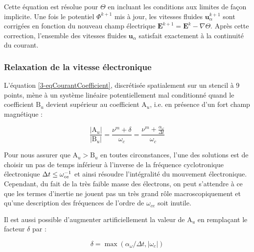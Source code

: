 \begin{refsection}
Cette équation est résolue pour $\Theta$ en incluant les conditions aux limites
de façon implicite. Une fois le potentiel $\Phi^{k+1}$ mis à jour, les vitesses
fluides $\mathbf u^{k+1}_\alpha$ sont corrigées en fonction du nouveau champ
électrique $\mathbf{E}^{k+1}=\mathbf{E}^{k}-\nabla\Theta$.
Après cette correction, l'ensemble des vitesses fluides $\mathbf u_\alpha$
satisfait exactement à la continuité du courant.

\subsubsection{Relaxation de la vitesse électronique}

L'équation \eqref{3-eqCourantCoefficient}, discrétisée spatialement sur un
stencil à 9 points, mène à un système linéaire potentiellement mal conditionné
quand le coefficient $\text{B}_u$ devient supérieur au coefficient $\text{A}_u$,
i.e. en présence d'un fort champ magnétique :

\begin{equation}
\frac{|\text{A}_u|}{|\text{B}_u|}=\frac{\nu^m+\delta}{\omega_c}=\frac{\nu^m+\frac{\alpha_\omega}{\Delta
t}}{\omega_c}
\end{equation}

Pour nous assurer que $\text{A}_u>\text{B}_u$ en toutes circonstances, l'une
des solutions est de choisir un pas de temps inférieur à l'inverse de la
fréquence cyclotronique électronique $\Delta t\leq\omega_{ce}^{{-1}}$ et
ainsi résoudre l'intégralité du mouvement électronique. Cependant, du fait de
la très faible masse des électrons, on peut s'attendre à ce que les termes
d'inertie ne jouent pas un très grand rôle macroscopiquement et qu'une
description des fréquences de l'ordre de $\omega_{ce}$ soit inutile.

Il est aussi possible d'augmenter artificiellement la valeur de $\text{A}_u$ en
remplaçant le facteur $\delta$ par :

\begin{equation}
\delta=\max(\alpha_\omega/\Delta t,|\omega_c|)
\end{equation}


\end{refsection}
